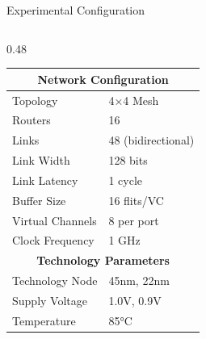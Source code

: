 \documentclass[10pt,aspectratio=169]{beamer}
\begin{document}
\begin{frame}{Experimental Configuration}
    \begin{columns}[T]
        \begin{column}{0.48\textwidth}
            \begin{table}[h]
                \centering
                \footnotesize
                \begin{tabular}{|l|l|}
                    \hline
                    \multicolumn{2}{|c|}{\textbf{Network Configuration}} \\
                    \hline
                    Topology & 4×4 Mesh \\
                    Routers & 16 \\
                    Links & 48 (bidirectional) \\
                    Link Width & 128 bits \\
                    Link Latency & 1 cycle \\
                    Buffer Size & 16 flits/VC \\
                    Virtual Channels & 8 per port \\
                    Clock Frequency & 1 GHz \\
                    \hline
                    \multicolumn{2}{|c|}{\textbf{Technology Parameters}} \\
                    \hline
                    Technology Node & 45nm, 22nm \\
                    Supply Voltage & 1.0V, 0.9V \\
                    Temperature & 85°C \\
                    \hline
                \end{tabular}
            \end{table}
        \end{column}
        

\end{columns}
\end{frame}
\end{document}
